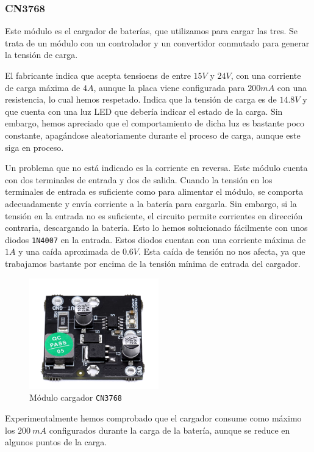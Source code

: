 \subsubsection{CN3768}

Este módulo es el cargador de baterías, que utilizamos para cargar las tres. Se trata de un módulo con un controlador y un convertidor conmutado para generar la tensión de carga. 

El fabricante indica que acepta tensioens de entre $15 V$ y $24 V$, con una corriente de carga máxima de $4 A$, aunque la placa viene configurada para $200 mA$ con una resistencia, lo cual hemos respetado. Indica que la tensión de carga es de $14.8 V$ y que cuenta con una luz LED que debería indicar el estado de la carga. Sin embargo, hemos apreciado que el comportamiento de dicha luz es bastante poco constante, apagándose aleatoriamente durante el proceso de carga, aunque este siga en proceso. \cite{consonanceCN3768}

Un problema que no está indicado es la corriente en reversa. Este módulo cuenta con dos terminales de entrada y dos de salida. Cuando la tensión en los terminales de entrada es suficiente como para alimentar el módulo, se comporta adecuadamente y envía corriente a la batería para cargarla. Sin embargo, si la tensión en la entrada no es suficiente, el circuito permite corrientes en dirección contraria, descargando la batería. Esto lo hemos solucionado fácilmente con unos diodos \texttt{1N4007} en la entrada. Estos diodos cuentan con una corriente máxima de $1 A$ y una caída aproximada de $0.6 V$. Esta caída de tensión no nos afecta, ya que trabajamos bastante por encima de la tensión mínima de entrada del cargador.

\begin{figure}[H]
    \centering
    \includegraphics[width=0.5\textwidth]{images/2-hardware/componentes/CN3768.png}
    \caption{Módulo cargador \texttt{CN3768}}
    \label{fig:hardware/modulos/cn3768}
\end{figure}

Experimentalmente hemos comprobado que el cargador consume como máximo los $200\ mA$ configurados durante la carga de la batería, aunque se reduce en algunos puntos de la carga.